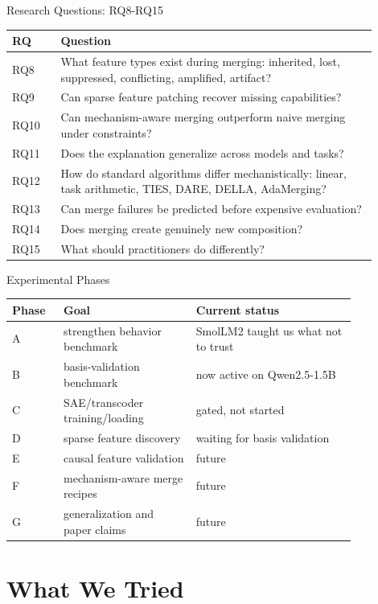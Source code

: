 \documentclass[aspectratio=169]{beamer}
\begin{document}
\begin{frame}{Research Questions: RQ8-RQ15}
  \scriptsize
  \begin{tabular}{p{0.12\linewidth}p{0.78\linewidth}}
    \toprule
    RQ & Question \\
    \midrule
    RQ8 & What feature types exist during merging: inherited, lost, suppressed, conflicting, amplified, artifact? \\
    RQ9 & Can sparse feature patching recover missing capabilities? \\
    RQ10 & Can mechanism-aware merging outperform naive merging under constraints? \\
    RQ11 & Does the explanation generalize across models and tasks? \\
    RQ12 & How do standard algorithms differ mechanistically: linear, task arithmetic, TIES, DARE, DELLA, AdaMerging? \\
    RQ13 & Can merge failures be predicted before expensive evaluation? \\
    RQ14 & Does merging create genuinely new composition? \\
    RQ15 & What should practitioners do differently? \\
    \bottomrule
  \end{tabular}
\end{frame}

\begin{frame}{Experimental Phases}
  \scriptsize
  \begin{tabular}{p{0.12\linewidth}p{0.33\linewidth}p{0.40\linewidth}}
    \toprule
    Phase & Goal & Current status \\
    \midrule
    A & strengthen behavior benchmark & SmolLM2 taught us what not to trust \\
    B & basis-validation benchmark & now active on Qwen2.5-1.5B \\
    C & SAE/transcoder training/loading & gated, not started \\
    D & sparse feature discovery & waiting for basis validation \\
    E & causal feature validation & future \\
    F & mechanism-aware merge recipes & future \\
    G & generalization and paper claims & future \\
    \bottomrule
  \end{tabular}
\end{frame}

\section{What We Tried}
\end{document}
